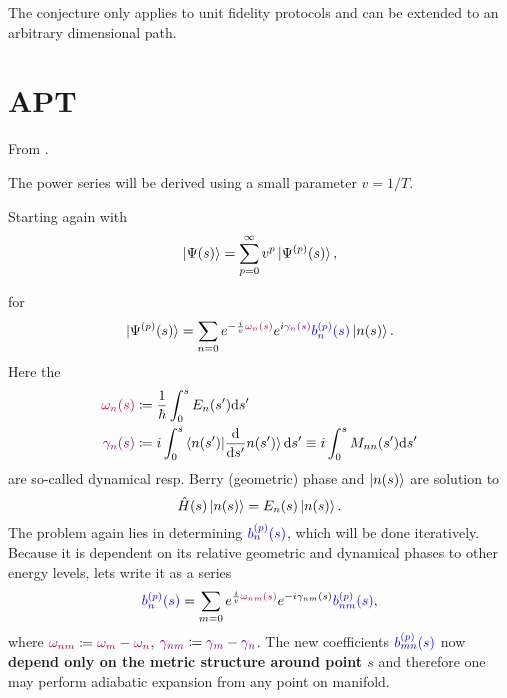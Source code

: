 The conjecture only applies to unit fidelity protocols and can be extended to an arbitrary dimensional path.






\section{APT}
From \cite{Rigolin2008}.

The power series will be derived using a small parameter $v=1/T$.

Starting again with
\begin{equation}
    \ket{\Psi(s)}=\sum_{p=0}^\infty v^p \ket{\Psi^{(p)}(s)},
    \label{eq:mainSeries}
\end{equation}

for 
\begin{equation}
    \ket{\Psi^{(p)}(s)}=\sum_{n=0} e^{-\frac{i}{v} \textcolor{purple}{\omega_n(s)}}e^{i\textcolor{violet}{\gamma_n(s)}}\textcolor{blue}{b_n^{(p)}(s)}\ket{n(s)}.
\end{equation}
Here the
\begin{align}
    \textcolor{purple}{\omega_n(s)} &\coloneqq \frac{1}{\hbar}\int_0^s E_n(s')\mathrm{d} s'\\
    \textcolor{violet}{\gamma_n(s)} &\coloneqq i\int_0^s \braket{n(s')|\frac{\mathrm{d}}{\mathrm{d} s'}n(s')}\mathrm{d} s' \equiv i\int_0^s M_{nn}(s')\mathrm{d} s'
    \label{eq:gammadef}
\end{align}
are so-called dynamical resp. Berry (geometric) phase and $\ket{n(s)}$ are solution to
\begin{equation}
    \hat{H}(s)\ket{n(s)}=E_n(s) \ket{n(s)}.
\end{equation}
The problem again lies in determining $\textcolor{blue}{b_n^{(p)}(s)}$, which will be done iteratively. Because it is dependent on its relative geometric and dynamical phases to other energy levels, lets write it as a series
\begin{equation}
    \textcolor{blue}{b_n^{(p)}(s)}=\sum_{m=0} e^{\frac{i}{v}\textcolor{purple}{\omega_{nm}(s)}}e^{-i\gamma_{nm}(s)}\textcolor{blue}{b_{nm}^{(p)}(s)},
\end{equation}
where $\textcolor{purple}{\omega_{nm}} \coloneqq \textcolor{purple}{\omega_m}-\textcolor{purple}{\omega_n}$, $\textcolor{violet}{\gamma_{nm}} \coloneqq \textcolor{violet}{\gamma_m}-\textcolor{violet}{\gamma_n}$. The new coefficients $\textcolor{blue}{b_{mn}^{(p)}(s)}$ now \textbf{depend only on the metric structure around point $s$} and therefore one may perform adiabatic expansion from any point on manifold.

